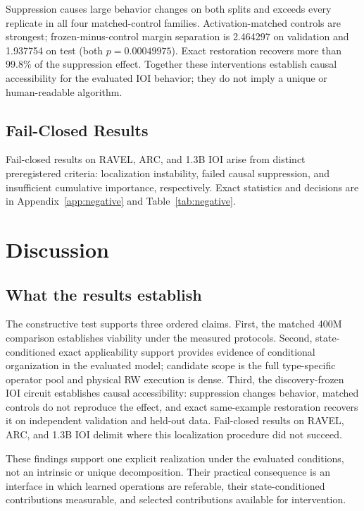 \documentclass{article}
\begin{document}
Suppression causes large behavior changes on both splits and exceeds every
replicate in all four matched-control families. Activation-matched controls are
strongest; frozen-minus-control margin separation is 2.464297 on validation and
1.937754 on test (both \(p=0.00049975\)). Exact restoration recovers more than
99.8\% of the suppression effect. Together these interventions establish causal
accessibility for the evaluated IOI behavior; they do not imply a unique or
human-readable algorithm.

\subsection{Fail-Closed Results}
\label{sec:negatives}

Fail-closed results on RAVEL, ARC, and 1.3B IOI arise from distinct
preregistered criteria:
localization instability, failed causal suppression, and insufficient
cumulative importance, respectively. Exact statistics and decisions are in
Appendix~\ref{app:negative} and Table~\ref{tab:negative}.

\balance
\section{Discussion}
\label{sec:discussion}

\subsection{What the results establish}

The constructive test supports three ordered claims. First, the matched 400M
comparison establishes viability under the measured protocols. Second,
state-conditioned exact applicability support provides evidence of conditional
organization in the evaluated model; candidate scope is the full type-specific
operator pool and physical RW execution is dense. Third, the discovery-frozen
IOI circuit establishes causal
accessibility: suppression changes behavior, matched controls do not reproduce
the effect, and exact same-example restoration recovers it on independent
validation and held-out data. Fail-closed results on RAVEL, ARC, and 1.3B IOI
delimit where this localization procedure did not succeed.

These findings support one explicit realization under the evaluated conditions,
not an intrinsic or unique decomposition. Their practical consequence is an
interface in which learned operations are referable, their state-conditioned
contributions measurable, and selected contributions available for intervention.
\end{document}
